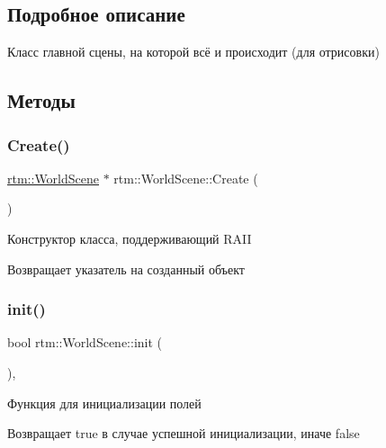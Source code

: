\subsection{Подробное описание}
Класс главной сцены, на которой всё и происходит (для отрисовки) 

\subsection{Методы}
\mbox{\label{classrtm_1_1_world_scene_a4d9c6dcf1fc6a02c1d090caed0ad6745}} 
\subsubsection{\texorpdfstring{Create()}{Create()}}
{\footnotesize\ttfamily \hyperlink{classrtm_1_1_world_scene}{rtm\+::\+World\+Scene} $\ast$ rtm\+::\+World\+Scene\+::\+Create (\begin{DoxyParamCaption}{ }\end{DoxyParamCaption})\hspace{0.3cm}{\ttfamily [static]}}

Конструктор класса, поддерживающий R\+A\+II \begin{DoxyReturn}{Возвращает}
указатель на созданный объект 
\end{DoxyReturn}
\mbox{\label{classrtm_1_1_world_scene_a53da1782e50b99e90831bceb54c69ab9}} 
\subsubsection{\texorpdfstring{init()}{init()}}
{\footnotesize\ttfamily bool rtm\+::\+World\+Scene\+::init (\begin{DoxyParamCaption}{ }\end{DoxyParamCaption})\hspace{0.3cm}{\ttfamily [override]}, {\ttfamily [virtual]}}

Функция для инициализации полей \begin{DoxyReturn}{Возвращает}
true в случае успешной инициализации, иначе false 
\end{DoxyReturn}
\mbox{\label{classrtm_1_1_world_scene_a243c2d00cc0e525738b099eea7120fba}} 
